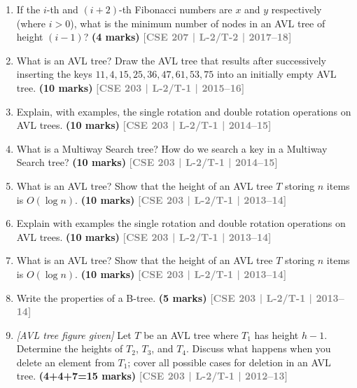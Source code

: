 \documentclass[12pt,a3paper]{article}
\newcommand{\yr}[1]{\hfill\textcolor{gray}{\small\textbf{[#1]}}}
\newcommand{\mk}[1]{\textcolor{orange!70!black}{\small\textbf{(#1 marks)}}}
\begin{document}
\begin{enumerate}
\item If the $i$-th and $(i+2)$-th Fibonacci numbers are $x$ and $y$ respectively (where $i > 0$), what is the minimum number of nodes in an AVL tree of height $(i-1)$? \mk{4}
\yr{CSE 207 | L-2/T-2 | 2017--18}

\item What is an AVL tree? Draw the AVL tree that results after successively inserting the keys $11, 4, 15, 25, 36, 47, 61, 53, 75$ into an initially empty AVL tree. \mk{10}
\yr{CSE 203 | L-2/T-1 | 2015--16}

\item Explain, with examples, the single rotation and double rotation operations on AVL trees. \mk{10}
\yr{CSE 203 | L-2/T-1 | 2014--15}

\item What is a Multiway Search tree? How do we search a key in a Multiway Search tree? \mk{10}
\yr{CSE 203 | L-2/T-1 | 2014--15}


\item What is an AVL tree? Show that the height of an AVL tree $T$ storing $n$ items is $O(\log n)$. \mk{10}
\yr{CSE 203 | L-2/T-1 | 2013--14}

\item Explain with examples the single rotation and double rotation operations on AVL trees. \mk{10}
\yr{CSE 203 | L-2/T-1 | 2013--14}

\item What is an AVL tree? Show that the height of an AVL tree $T$ storing $n$ items is $O(\log n)$. \mk{10}
\yr{CSE 203 | L-2/T-1 | 2013--14}

\item Write the properties of a B-tree. \mk{5}
\yr{CSE 203 | L-2/T-1 | 2013--14}

\item \textit{[AVL tree figure given]} Let $T$ be an AVL tree where $T_1$ has height $h-1$. Determine the heights of $T_2$, $T_3$, and $T_4$. Discuss what happens when you delete an element from $T_1$; cover all possible cases for deletion in an AVL tree. \mk{4+4+7=15}
\yr{CSE 203 | L-2/T-1 | 2012--13}

\begin{center}
\begin{tikzpicture}[
        tree node/.style={
            circle, 
            draw, 
            minimum size=7mm, %
            inner sep=0pt
        },
        subtree/.style={
            isosceles triangle, 
            draw, 
            shape border rotate=90, 
            minimum width=8mm, 
            minimum height=10mm, 
            inner sep=0pt, 
            anchor=apex
        },
        level distance=1.5cm,
        sibling distance=3.5cm
    ]


\end{tikzpicture}
\end{center}
\end{enumerate}
\end{document}
